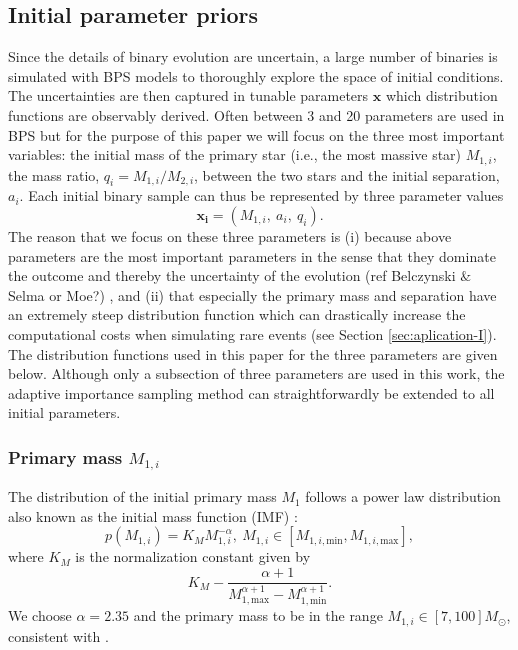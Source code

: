 \documentclass[a4paper,fleqn,usenatbib]{mnras}
\begin{document}
\subsection{Initial parameter priors}
\label{subsec:priorsCOMPAS}
Since the details of binary evolution are uncertain, a large number of binaries is simulated with BPS models to thoroughly explore the space of initial conditions. The uncertainties are then captured in tunable parameters $\mathbf{x}$  which distribution functions are observably derived. Often between 3 and 20 parameters are used in BPS but for the purpose of this paper we will focus on the three most important variables: the initial mass of the primary star (i.e., the most massive star) $M_{1,i}$, the mass ratio, $q_i = M_{1,i} / M_{2,i}$, between the two stars and  the initial separation, $a_i$. Each initial binary sample can thus be represented by three parameter values
%
\begin{equation}
	\mathbf{x_i} = (M_{1,i},\ a_i, \ q_i). 
\end{equation}
%
The reason that we focus on these three parameters is (i) because above parameters are the most important  parameters in the sense that they dominate the outcome and thereby the uncertainty of the evolution (ref Belczynski $\&$ Selma or Moe?) , and (ii) that especially the primary mass and separation have an extremely steep distribution function which can drastically increase the computational costs when simulating rare events (see Section \ref{sec:aplication-I}).  The distribution functions used in this paper for the three parameters are given below. 
Although only a subsection of three parameters are used in this work,   the adaptive importance sampling method can straightforwardly be extended to all initial parameters. 


\subsubsection{Primary mass $M_{1,i}$}


The distribution of the initial primary mass $M_1$ follows a power law distribution 
also known as the initial mass function (IMF) \citep{kroupa2001variation}:
%
\begin{equation}
    p(M_{1,i}) = K_M M_{1,i}^{-\alpha},  \ M_{1,i} \in [M_{1,i, \text{min}} , M_{1,i, \text{max}} ], 
\label{eq:prior-IMF}
\end{equation} 
%
where  $K_M$ is the normalization constant given by
%
\begin{equation*}
	K_M - \frac{\alpha + 1}{M_{1, \text{max}}^{\alpha +1 } -  M_{1, \text{min}}^{\alpha +1 }}. 
\end{equation*}
%
We choose $\alpha = 2.35$ and the primary mass to be in the range $M_{1,i} \in [7,100] M_{\odot}$, consistent with \citep{stevenson2017formation}.  \\
%
%
\end{document}
